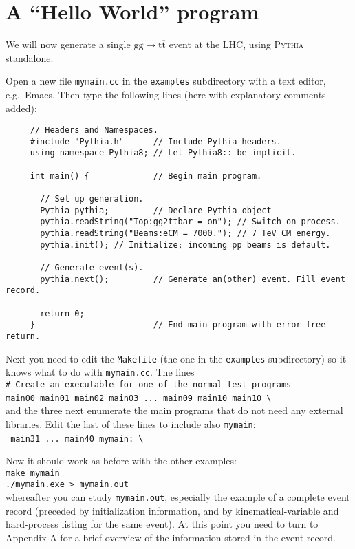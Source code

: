 \documentclass[12pt,a4paper]{article}
\newcommand{\g}{{\mathrm g}}
\renewcommand{\t}{{\mathrm t}}
\newcommand{\tbar}{\overline{\mathrm t}}
\begin{document}
\section{A ``Hello World'' program}

We will now generate a single $\g \g \to \t \tbar$ event at the LHC,
using \textsc{Pythia} standalone.

Open a new file \texttt{mymain.cc} in the \texttt{examples} subdirectory 
with a text editor, e.g.\ Emacs. 
Then type the following lines (here with explanatory comments added):
\begin{verbatim}
     // Headers and Namespaces.
     #include "Pythia.h"      // Include Pythia headers.
     using namespace Pythia8; // Let Pythia8:: be implicit.

     int main() {             // Begin main program.

       // Set up generation.
       Pythia pythia;         // Declare Pythia object
       pythia.readString("Top:gg2ttbar = on"); // Switch on process.
       pythia.readString("Beams:eCM = 7000."); // 7 TeV CM energy.      
       pythia.init(); // Initialize; incoming pp beams is default.

       // Generate event(s).
       pythia.next();         // Generate an(other) event. Fill event record.

       return 0;
     }                        // End main program with error-free return.
\end{verbatim}

Next you need to edit the \texttt{Makefile} (the one in the \texttt{examples} 
subdirectory) so it knows what to do with \texttt{mymain.cc}.
The lines\\
\hspace*{10mm}\texttt{\# Create an executable for one of the normal test 
programs}\\
\hspace*{10mm}\texttt{main00  main01 main02 main03 ... main09 main10 
main10}~\verb+\+ \\
and the three next enumerate the main programs that do not need any 
external libraries. Edit the last of these lines to include also 
\texttt{mymain}:\\
\hspace*{10mm}\texttt{        main31 ... main40 mymain:}~\verb+\+

Now it should work as before with the other examples:\\
\hspace*{10mm}\texttt{make mymain}\\
\hspace*{10mm}\texttt{./mymain.exe > mymain.out}\\
whereafter you can study \texttt{mymain.out}, especially the 
example of a complete event record (preceded by initialization information,
and by kinematical-variable and hard-process listing for the same event). 
At this point you need to turn to Appendix A for a brief overview of the 
information stored in the event record. 
\end{document}
